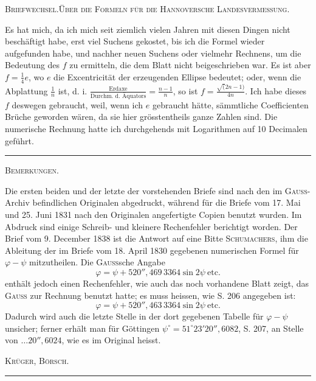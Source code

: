 \par\clearpage
{}\hfill{\footnotesize\textsc{Briefwechsel.\quad Über die Formeln für die Hannoversche Landesvermessung.}}\par\medskip
Es hat mich, da ich mich seit ziemlich vielen Jahren mit diesen Dingen nicht beschäftigt habe, erst viel Suchens gekostet, bis ich die Formel wieder aufgefunden habe, und nachher neuen Suchens oder vielmehr Rechnens, um die Bedeutung des \(f\) zu ermitteln, die dem Blatt nicht beigeschrieben war. Es ist aber \(f=\frac14e\), wo \(e\) die Excentricität der erzeugenden Ellipse bedeutet; oder, wenn die Abplattung \(\frac1n\) ist, d. i. \(\frac{\text{Erdaxe}}{\text{Durchm. d. Äquators}}=\frac{n-1}n\), so ist \(f=\frac{\surd(2n-1)}{4n}\). Ich habe dieses \(f\) deswegen gebraucht, weil, wenn ich \(e\) gebraucht hätte, sämmtliche Coefficienten Brüche geworden wären, da sie hier grösstentheils ganze Zahlen sind. Die numerische Rechnung hatte ich durchgehends mit Logarithmen auf 10 Decimalen geführt.
\begin{center}\rule{3cm}{.4pt}\end{center}
\bigskip
\begin{center}\textsc{Bemerkungen.}\end{center}
\begingroup\footnotesize
Die ersten beiden und der letzte der vorstehenden Briefe sind nach den im \textsc{Gauss}-Archiv befindlichen Originalen abgedruckt, während für die Briefe vom 17. Mai und 25. Juni 1831 nach den Originalen angefertigte Copien benutzt wurden. Im Abdruck sind einige Schreib- und kleinere Rechenfehler berichtigt worden. Der Brief vom 9. December 1838 ist die Antwort auf eine Bitte \textsc{Schumachers}, ihm die Ableitung der im Briefe vom 18. April 1830 gegebenen numerischen Formel für \(\varphi-\psi\) mitzutheilen. Die \textsc{Gauss}sche Angabe
\[
\varphi=\psi+520''{,}469\,3364\sin2\psi\ \text{etc.}
\]
\noindent enthält jedoch einen Rechenfehler, wie auch das noch vorhandene Blatt zeigt, das \textsc{Gauss} zur Rechnung benutzt hatte; es muss heissen, wie S. 206 angegeben ist:
\[
\varphi=\psi+520''{,}463\,3364\sin2\psi\ \text{etc.}
\]
\noindent Dadurch wird auch die letzte Stelle in der dort gegebenen Tabelle für \(\varphi-\psi\) unsicher; ferner erhält man für Göttingen \(\psi^\circ=51^\circ23'20''{,}6082\), S. 207, an Stelle von \(\ldots20''{,}6024\), wie es im Original heisst.
\par\noindent\hfill\textsc{Krüger, Börsch.}\par
\endgroup
\vspace{1.8cm}\begin{center}\rule{4cm}{.4pt}\end{center}

